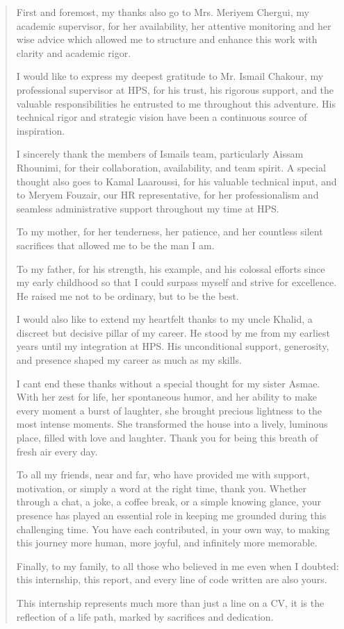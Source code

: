 \documentclass[12pt,a4paper]{report}
\begin{document}
\begin{quote}
First and foremost, my thanks also go to Mrs. Meriyem Chergui, my
academic supervisor, for her availability, her attentive monitoring and
her wise advice which allowed me to structure and enhance this work with
clarity and academic rigor.

I would like to express my deepest gratitude to Mr. Ismail Chakour, my
professional supervisor at HPS, for his trust, his rigorous support, and
the valuable responsibilities he entrusted to me throughout this
adventure. His technical rigor and strategic vision have been a
continuous source of inspiration.

I sincerely thank the members of Ismail\textquotesingle s team,
particularly Aissam Rhounimi, for their collaboration, availability, and
team spirit. A special thought also goes to Kamal Laaroussi, for his
valuable technical input, and to Meryem Fouzair, our HR representative,
for her professionalism and seamless administrative support throughout
my time at HPS.

To my mother, for her tenderness, her patience, and her countless silent
sacrifices that allowed me to be the man I am.

To my father, for his strength, his example, and his colossal efforts
since my early childhood so that I could surpass myself and strive for
excellence. He raised me not to be ordinary, but to be the best.

I would also like to extend my heartfelt thanks to my uncle Khalid, a
discreet but decisive pillar of my career. He stood by me from my
earliest years until my integration at HPS. His unconditional support,
generosity, and presence shaped my career as much as my skills.

I can\textquotesingle t end these thanks without a special thought for
my sister Asmae. With her zest for life, her spontaneous humor, and her
ability to make every moment a burst of laughter, she brought precious
lightness to the most intense moments. She transformed the house into a
lively, luminous place, filled with love and laughter. Thank you for
being this breath of fresh air every day.

To all my friends, near and far, who have provided me with support,
motivation, or simply a word at the right time, thank you. Whether
through a chat, a joke, a coffee break, or a simple knowing glance, your
presence has played an essential role in keeping me grounded during this
challenging time. You have each contributed, in your own way, to making
this journey more human, more joyful, and infinitely more memorable.

Finally, to my family, to all those who believed in me even when I
doubted: this internship, this report, and every line of code written
are also yours.

This internship represents much more than just a line on a CV, it is the
reflection of a life path, marked by sacrifices and dedication.
\end{quote}
\clearpage
\end{document}
